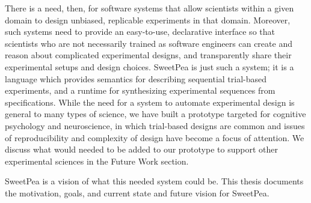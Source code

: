 There is a need, then, for software systems that allow scientists within a given domain to design unbiased, replicable experiments in that domain. Moreover, such systems need to provide an easy-to-use, declarative interface so that scientists who are not necessarily trained as software engineers can create and reason about complicated experimental designs, and transparently share their experimental setups and design choices. SweetPea is just such a system; it is a language which provides semantics for describing sequential trial-based experiments, and a runtime for synthesizing experimental sequences from specifications. While the need for a system to automate experimental design is general to many types of science, we have built a prototype targeted for cognitive psychology and neuroscience, in which trial-based designs are common and issues of reproducibility and complexity of design have become a focus of attention. We discuss what would needed to be added to our prototype to support other experimental sciences in the Future Work section. 

SweetPea is a vision of what this needed system could be. This thesis documents the motivation, goals, and current state and future vision for SweetPea.




